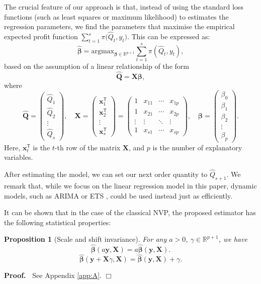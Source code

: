 \documentclass{article}
\newtheorem{proposition}{Proposition}
\newenvironment{proof}
 {\begin{trivlist} \item[] {\bf Proof.\ }}{\hfill$\Box$ \end{trivlist}}
\begin{document}
The crucial feature of our approach is that, instead of using the standard loss functions (such as least squares or maximum likelihood) to estimates the regression parameters, we find the parameters that maximise the empirical expected profit function $\sum_{t=1}^s{\pi \big( \hat{Q}_t,y_t \big)}$. This can be expressed as:
\[
    \hat{\boldsymbol{\beta}}=\text{argmax}_{\boldsymbol{\beta}\in \mathbb{R}^{p+1}}\displaystyle\sum_{t=1}^s{\pi(\hat{Q}_t,y_t)},
\]
based on the assumption of a linear relationship of the form
\[
    \mathbf{\hat{Q}}=\mathbf{X}\boldsymbol{\beta},
\]
where
\[
    \mathbf{\hat{Q}}=
    \begin{pmatrix}
        \hat{Q}_1\\
        \hat{Q}_2\\
        \vdots\\
        \hat{Q}_s
    \end{pmatrix}, \quad
    \mathbf{X}=
    \begin{pmatrix}
        \mathbf{x}_1^{\mathsf{T}}\\
        \mathbf{x}_2^{\mathsf{T}}\\
        \vdots\\
        \mathbf{x}_s^{\mathsf{T}}
    \end{pmatrix}=
    \begin{pmatrix}
        1&x_{11}&\cdots &x_{1p}\\
        1&x_{21}&\cdots &x_{2p}\\
        \vdots &\vdots &\ddots &\vdots \\
        1&x_{s1}&\cdots &x_{sp}
    \end{pmatrix}, \quad
    \boldsymbol{\beta}=
    \begin{pmatrix}
        \beta_0\\
        \beta_1\\
        \beta_2\\
        \vdots\\
        \beta_{p}
    \end{pmatrix}.
\]
Here, $\mathbf{x}_t^{\mathsf{T}}$ is the $t$-th row of the matrix $\mathbf{X}$, and $p$ is the number of explanatory variables.

After estimating the model, we can set our next order quantity to $\hat{Q}_{s+1}$. We remark that, while we focus on the linear regression model in this paper, dynamic models, such as ARIMA or ETS \cite{HKO08}, could be used instead just as efficiently.

It can be shown that in the case of the classical NVP, the proposed estimator has the following statistical properties:
\begin{proposition}[Scale and shift invariance]
For any $a>0$, $\gamma\in \mathbb{R}^{p+1}$, we have
\[
    \hat{\boldsymbol{\beta}}(a\mathbf{y},\mathbf{X})=a\hat{\boldsymbol{\beta}}(\mathbf{y},\mathbf{X}).
\]
\[
    \hat{\boldsymbol{\beta}}(\mathbf{y}+\mathbf{X}\gamma,\mathbf{X})=
    \hat{\boldsymbol{\beta}}(\mathbf{y},\mathbf{X})+\gamma.
\]
\end{proposition}
\begin{proof}
See Appendix \ref{app:A}.
\end{proof}
\end{document}
